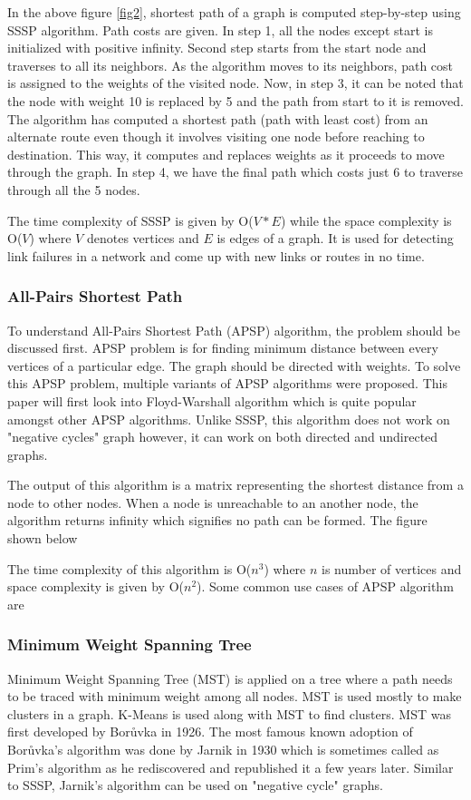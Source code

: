 \documentclass[journal,twoside,web]{ieeecolor}
\begin{document}
In the above figure \ref{fig2}, shortest path of a graph is computed step-by-step using SSSP algorithm. Path costs are given. In step 1, all the nodes except start is initialized with positive infinity. Second step starts from the start node and traverses to all its neighbors. As the algorithm moves to its neighbors, path cost is assigned to the weights of the visited node. Now, in step 3, it can be noted that the node with weight 10 is replaced by 5 and the path from start to it is removed. The algorithm has computed a shortest path (path with least cost) from an alternate route even though it involves visiting one node before reaching to destination. This way, it computes and replaces weights as it proceeds to move through the graph. In step 4, we have the final path which costs just 6 to traverse through all the 5 nodes.

The time complexity of SSSP is given by O($V*E$) while the space complexity is O($V$) where $V$ denotes vertices and $E$ is edges of a graph. It is used for detecting link failures in a network and come up with new links or routes in no time.

\subsubsection{All-Pairs Shortest Path}
To understand All-Pairs Shortest Path (APSP) algorithm, the problem should be discussed first. APSP problem is for finding minimum distance between every vertices of a particular edge. The graph should be directed with weights. To solve this APSP problem, multiple variants of APSP algorithms were proposed\cite{43, 44, 45, 46}. This paper will first look into Floyd-Warshall algorithm which is quite popular amongst other APSP algorithms. Unlike SSSP, this algorithm does not work on "negative cycles" graph however, it can work on both directed and undirected graphs.

The output of this algorithm is a matrix representing the shortest distance from a node to other nodes. When a node is unreachable to an another node, the algorithm returns infinity which signifies no path can be formed. The figure shown below  



The time complexity of this algorithm is O($n^3$) where $n$ is number of vertices and space complexity is given by O($n^2$). Some common use cases of APSP algorithm are


\subsubsection{Minimum Weight Spanning Tree}
Minimum Weight Spanning Tree (MST) is applied on a tree where a path needs to be traced with minimum weight among all nodes. MST is used mostly to make clusters in a graph. K-Means is used along with MST to find clusters. MST was first developed by Borůvka in 1926\cite{47}. The most famous known adoption of Borůvka's algorithm was done by Jarnik in 1930\cite{48} which is sometimes called as Prim's algorithm as he rediscovered and republished it a few years later\cite{49}. Similar to SSSP, Jarnik's algorithm can be used on "negative cycle" graphs.
\end{document}
